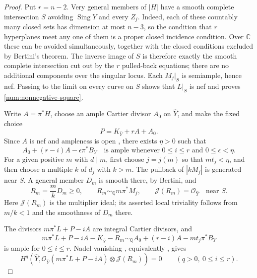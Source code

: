 \begin{proof}
Put \(r=n-2\).  Very general members of \(|H|\) have a smooth
complete intersection \(S\) avoiding \(\operatorname{Sing}Y\) and
every \(Z_j\).  Indeed, each of these countably many closed sets has
dimension at most \(n-3\), so the condition that \(r\) hyperplanes
meet any one of them is a proper closed incidence condition.
Over \(\mathbb C\) these can be avoided simultaneously, together
with the closed conditions excluded by Bertini's theorem.
The inverse image of \(S\) is therefore exactly the smooth
complete intersection cut out by the \(r\) pulled-back equations;
there are no additional components over the singular locus.
Each \(M_j|_S\) is semiample, hence nef.  Passing to the limit on
every curve on \(S\) shows that \(L|_S\) is nef and proves
\eqref{num:nonnegative-square}.

Write \(A=\pi^*H\), choose an ample Cartier divisor \(A_0\) on
\(\widehat Y\), and make the fixed choice
\begin{equation}\label{num:fixed-twist}
P=K_{\widehat Y}+rA+A_0.
\end{equation}
Since \(A\) is nef and ampleness is open
\cite[Corollary~1.4.10 and Theorem~1.4.23]{Laz04I}, there exists \(\eta>0\)
such that
\begin{equation}\label{num:ample-errors}
A_0+(r-i)A-\epsilon\pi^*B_Y
\quad\text{is ample whenever }0\leq i\leq r
\text{ and }0\leq\epsilon<\eta.
\end{equation}
For a given positive \(m\) with \(d\mid m\), first choose
\(j=j(m)\) so that \(mt_j<\eta\), and then choose a multiple
\(k\) of \(d_j\) with \(k>m\).  The pullback of
\(|kM_j|\) is generated near \(S\).  A general member \(D_m\)
is smooth there, by Bertini, and
\[
R_m=\frac{m}{k}D_m\geq 0,
\qquad R_m\sim_{\mathbb Q}m\pi^*M_j,
\qquad \mathcal J(R_m)=\mathcal O_{\widehat Y}
\quad\text{near }S.
\]
Here \(\mathcal J(R_m)\) is the multiplier ideal; its asserted
local triviality follows from \(m/k<1\) and the smoothness of
\(D_m\) there.

The divisors \(m\pi^*L+P-iA\) are integral Cartier divisors, and
\[
m\pi^*L+P-iA-K_{\widehat Y}-R_m
\sim_{\mathbb Q}
A_0+(r-i)A-mt_j\pi^*B_Y
\]
is ample for \(0\leq i\leq r\).  Nadel vanishing
\cite[Theorem~9.4.8]{Laz04II}, equivalently
\cite[Theorem~2.4]{LazMI}, gives
\begin{equation}\label{num:nadel}
H^q\!\left(\widehat Y,
\mathcal O_{\widehat Y}(m\pi^*L+P-iA)
\otimes\mathcal J(R_m)\right)=0
\qquad(q>0,\ 0\leq i\leq r).
\end{equation}


\end{proof}
